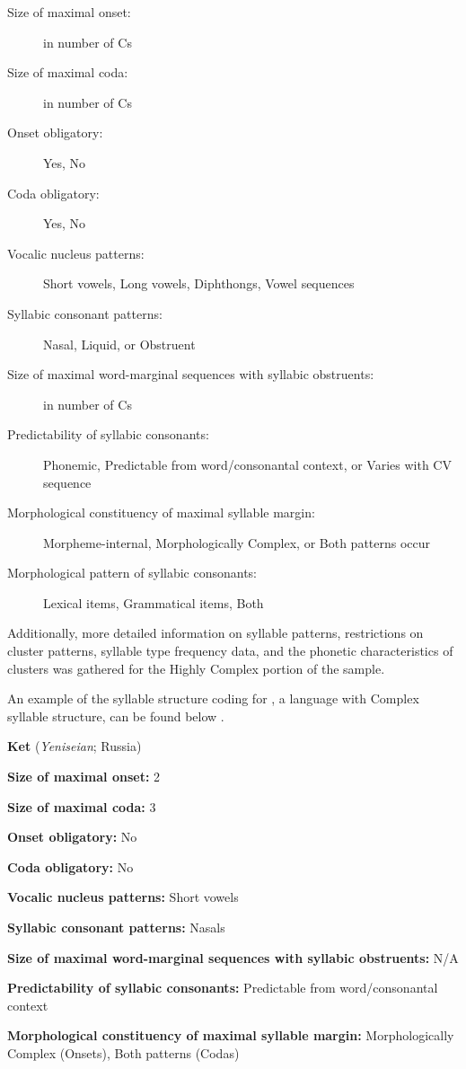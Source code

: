   \begin{description}
\item[Size of maximal onset:] in number of Cs
\item[Size of maximal coda:] in number of Cs
\item[Onset obligatory:] Yes, No
\item[Coda obligatory:] Yes, No
\item[Vocalic nucleus patterns:] Short vowels, Long vowels, Diphthongs, Vowel sequences
\item[Syllabic consonant patterns:] Nasal, Liquid, or Obstruent
\item[Size of maximal word-marginal sequences with syllabic obstruents:] in number of Cs
\item[Predictability of syllabic consonants:] Phonemic, Predictable from word/consonantal context, or Varies with CV sequence
\item[Morphological constituency of maximal syllable margin:] Morpheme-internal, Morphologically Complex, or Both patterns occur
\item[Morphological pattern of syllabic consonants:] Lexical items, Grammatical items, Both 
\end{description}

Additionally, more detailed information on syllable patterns, restrictions on cluster patterns, syllable type frequency data, and the phonetic characteristics of clusters was gathered for the Highly Complex portion of the sample.

  An example of the syllable structure coding for , a language with Complex syllable structure, can be found below .

\ea\label{ex:3.11}
  \textbf{Ket} (\textit{Yeniseian}; Russia)

\textbf{Size of maximal onset:} 2

\textbf{Size of maximal coda:} 3

\textbf{Onset obligatory:} No

\textbf{Coda obligatory:} No

\textbf{Vocalic nucleus patterns:} Short vowels

\textbf{Syllabic consonant patterns:} Nasals

\textbf{Size of maximal word-marginal sequences with syllabic obstruents:} N/A

\textbf{Predictability of syllabic consonants:} Predictable from word/consonantal context

\textbf{Morphological constituency of maximal syllable margin:} Morphologically Complex (Onsets), Both patterns (Codas)

